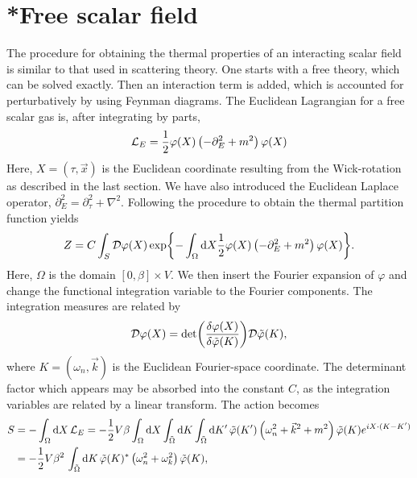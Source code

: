 \section{*Free scalar field}
\label{section:free scalar field}

The procedure for obtaining the thermal properties of an interacting scalar field is similar to that used in scattering theory.
One starts with a free theory, which can be solved exactly.
Then an interaction term is added, which is accounted for perturbatively by using Feynman diagrams.
The Euclidean Lagrangian for a free scalar gas is, after integrating by parts,
\begin{equation}
    \mathcal{L}_E = \frac{1}{2} \varphi(X) \left( -\partial_E^2 + m^2 \right) \varphi(X)
\end{equation}
Here, $X = (\tau, \vec x)$ is the Euclidean coordinate resulting from the Wick-rotation as described in the last section.
We have also introduced the Euclidean Laplace operator, $\partial_E^2 = \partial_\tau^2 + \nabla^2$.
Following the procedure to obtain the thermal partition function yields
\begin{equation}
    Z = C \int_S \mathcal D \varphi(X) 
    \exp{
        - \int_\Omega \dd X \frac{1}{2} 
        \varphi(X) \left( -\partial_E^2 + m^2 \right) \varphi(X)
    }.
\end{equation}
Here, $\Omega$ is the domain $[0, \beta] \times V$.
We then insert the Fourier expansion of $\varphi$ and change the functional integration variable to the Fourier components.
The integration measures are related by
\begin{equation*}
    \mathcal D \varphi(X) = \det(\frac{\delta \varphi(X)}{\delta \tilde \varphi(K)}) \mathcal D\tilde \varphi(K),
\end{equation*}
where $K = (\omega_n, \vec k)$ is the Euclidean Fourier-space coordinate.
The determinant factor which appears may be absorbed into the constant $C$, as the integration variables are related by a linear transform.
The action becomes 
\begin{align*}
    S & = - \int_\Omega \dd X\, \mathcal{L}_E 
    = - \frac{1}{2} V \beta \int_\Omega \dd X \int_{\tilde \Omega} \dd K \int_{\tilde \Omega} \dd K' \,
    \tilde \varphi(K') 
    \left(
        \omega_n^2 + \vec k^2 + m^2
    \right)
    \tilde \varphi(K)
    e^{iX\cdot(K - K')} \\
    & = - \frac{1}{2} V \beta^2 \, \int_{\tilde \Omega} \dd K \,
    \tilde \varphi(K)^*
    \left(
        \omega_n^2 + \omega_k^2
    \right)
    \tilde \varphi(K),
\end{align*}
